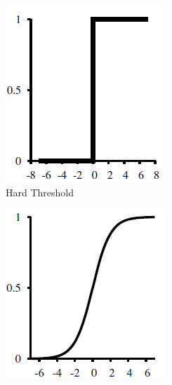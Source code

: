 \begin{figure}
\centering
\begin{subfigure}{.5\textwidth}
  \centering
  \includegraphics[width=\linewidth]{Credit_Images/hard_threshold.png}
  \caption{Hard Threshold}
  \label{fig:hard-threshold}
\end{subfigure}%
\begin{subfigure}{.5\textwidth}
  \centering
  \includegraphics[width=\linewidth]{Credit_Images/soft_threshold.png}

\end{subfigure}
\end{figure}
